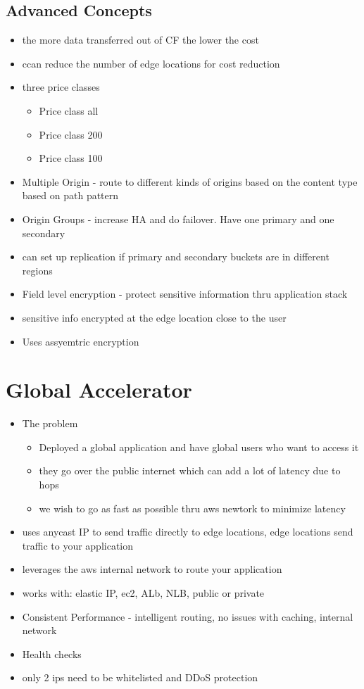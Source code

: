 \documentclass[]{scrartcl}
\begin{document}
\subsection{Advanced Concepts}
\begin{itemize}
	\item the more data transferred out of CF the lower the cost
	\item ccan reduce the number of edge locations for cost reduction
	\item three price classes
	\begin{itemize}
		\item Price class all
		\item Price class 200
		\item Price class 100
	\end{itemize}
	\item Multiple Origin - route to different kinds of origins based on the content type based on path pattern
	\item Origin Groups - increase HA and do failover. Have one primary and one secondary
	\item can set up replication if primary and secondary buckets are in different regions
	\item Field level encryption - protect sensitive information thru application stack
	\item sensitive info encrypted at the edge location close to the user
	\item Uses assyemtric encryption
\end{itemize}

\section{Global Accelerator}
\begin{itemize}
	\item The problem
	\begin{itemize}
		\item Deployed a global application and have global users who want to access it
		\item they go over the public internet which can add a lot of latency due to hops
		\item we wish to go as fast as possible thru aws newtork to minimize latency
	\end{itemize}
	\item uses anycast IP to send traffic directly to edge locations, edge locations send traffic to your application
	\item leverages the aws internal network to route your application
	\item works with: elastic IP, ec2, ALb, NLB, public or private
	\item Consistent Performance - intelligent routing, no issues with caching, internal network
	\item Health checks
	\item only 2 ips need to be whitelisted and DDoS protection
\end{itemize}
\end{document}
